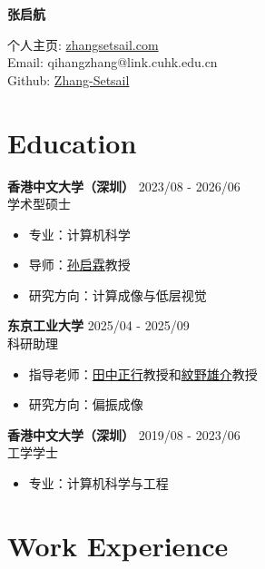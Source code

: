 \documentclass[a4paper,11pt]{article}
\newcommand{\projectspace}{\vspace{8pt}}
\begin{document}
\centerline{\Large\bf 张启航}
\centerline{个人主页: \href{https://zhangsetsail.com/zn_ch}{zhangsetsail.com} \\ Email: qihangzhang@link.cuhk.edu.cn \\ Github: \href{https://github.com/Zhang-Setsail}{Zhang-Setsail}} 

\section*{Education}

\textbf{香港中文大学（深圳）} \hfill 2023/08 - 2026/06 \\
学术型硕士
\begin{itemize}[noitemsep]
  \item 专业：计算机科学
  \item 导师：\href{https://scholar.google.com/citations?hl=zh-CN&user=igqPS8sAAAAJ&view_op=list_works&sortby=pubdate}{孙启霖}教授
  \item 研究方向：计算成像与低层视觉
\end{itemize}

\projectspace
\textbf{东京工业大学} \hfill 2025/04 - 2025/09 \\
科研助理
\begin{itemize}[noitemsep]
  \item 指导老师：\href{https://www.vip.sc.eng.isct.ac.jp/mtanaka/}{田中正行}教授和\href{http://www.ok.sc.e.titech.ac.jp/~ymonno/}{紋野雄介}教授
  \item 研究方向：偏振成像
\end{itemize}

\projectspace
\textbf{香港中文大学（深圳）} \hfill 2019/08 - 2023/06 \\
工学学士
\begin{itemize}[noitemsep]
  \item 专业：计算机科学与工程
\end{itemize}

\section*{Work Experience}
\end{document}
